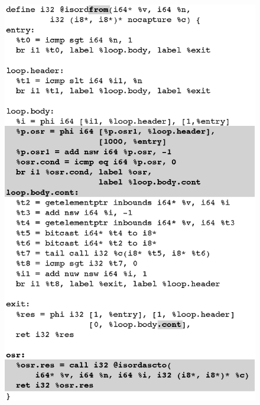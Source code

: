 \ifdefined\noauthorea
\begin{figure}[t]
\begin{center}
\includegraphics[width=0.9\columnwidth]{figures/isordfrom/isordfrom.eps}
\caption{\protect}
\end{center}
\end{figure}
\fi

